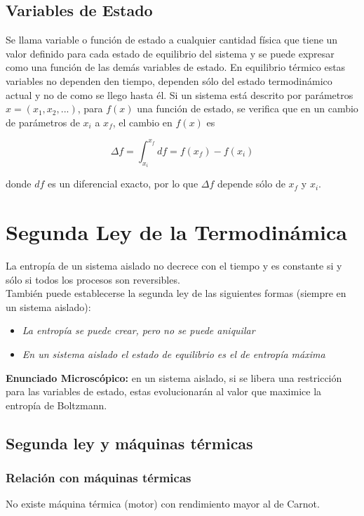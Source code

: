 \subsection{Variables de Estado}

Se llama variable o función de estado a cualquier cantidad física que tiene un valor definido para cada estado de equilibrio del sistema y se puede expresar como una función de las demás variables de estado. En equilibrio térmico estas variables no dependen den tiempo, dependen sólo del estado termodinámico actual y no de como se llego hasta él.
\medbreak
Si un sistema está descrito por parámetros $x=(x_1, x_2, ...)$, para $f(x)$ una función de estado, se verifica que en un cambio de parámetros de $x_i$ a $x_f$, el cambio en $f(x)$ es

\[\Delta f = \int^{x_f}_{x_i}df = f(x_f)-f(x_i)\]

donde $df$ es un diferencial exacto, por lo que $\Delta f$ depende sólo de $x_f$ y $x_i$.

\section{Segunda Ley de la Termodinámica}
\label{2ley}
La entropía de un sistema aislado no decrece con el tiempo y es constante si y sólo si todos los procesos son reversibles.\\

También puede establecerse la segunda ley de las siguientes formas (siempre en un sistema aislado):
\begin{itemize}
    \item \textit{La entropía se puede crear, pero no se puede aniquilar}
    \item \textit{En un sistema aislado el estado de equilibrio es el de entropía máxima}
\end{itemize}

\textbf{Enunciado Microscópico:} en un sistema aislado, si se libera una restricción para las variables de estado, estas evolucionarán al valor que maximice la entropía de Boltzmann.\\

\subsection{Segunda ley y máquinas térmicas}

\subsubsection{Relación con máquinas térmicas} 
\label{2ley-motor}
No existe máquina térmica (motor) con rendimiento mayor al de Carnot.

